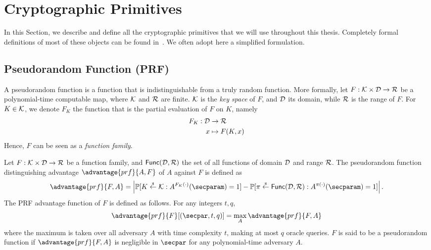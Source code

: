 
\section{Cryptographic Primitives} %
\label{sec:cryptographic_primitives}

In this Section, we describe and define all the cryptographic primitives that we will use throughout this thesis.
Completely formal definitions of most of these objects can be found in~\cite{BOOK:Goldreich04}.
We often adopt here a simplified formulation.

\subsection{Pseudorandom Function (PRF)} %
\label{sub:def_prf}

A pseudorandom function is a function that is indistinguishable from a truly random function.
More formally, let $F: \mathcal{K} \times \mathcal{D} \rightarrow \mathcal{R}$ be a polynomial-time computable map, where $\mathcal{K}$ and $\mathcal{R}$ are finite. 
$\mathcal{K}$ is the \emph{key space} of $F$, and $\mathcal{D}$ its domain, while $\mathcal{R}$ is the range of $F$.
For $K \in \mathcal{K}$, we denote $F_K$ the function that is the partial evaluation of $F$ on $K$, namely
\begin{align*}
	F_K : \mathcal{D} &\rightarrow \mathcal{R} \\
		x &\mapsto F(K,x)
\end{align*}
Hence, $F$ can be seen as a \emph{function family}. 

\begin{definition}
	\label{def:prf}
	Let $F: \mathcal{K} \times \mathcal{D} \rightarrow \mathcal{R}$ be a function family, and $\mathsf{Func}(\mathcal{D},\mathcal{R})$ the set of all functions of domain $\mathcal{D}$ and range $\mathcal{R}$.
	The pseudorandom function distinguishing advantage $\advantage{prf}{A, F}$ of $A$ against $F$ is defined as
	\[
		\advantage{prf}{F,A} = \left| \Prob[K \getsr \cK : A^{F_K(\cdot)}(\secparam) = 1] 
												- \Prob[\pi \getsr \mathsf{Func}(\cD,\cR) : A^{\pi(\cdot)}(\secparam) = 1] \right|.
	\]
	The PRF advantage function of $F$ is defined as follows. For any integers $t,q$,
	\[
		\advantage{prf}{F}[(\secpar, t, q)] = \max_{A} \advantage{prf}{F, A}
	\]
	where the maximum is taken over all adversary $A$ with time complexity $t$, making at most $q$ oracle queries.
	$F$ is said to be a pseudorandom function if $\advantage{prf}{F,A}$ is negligible in $\secpar$ for any polynomial-time adversary $A$.
\end{definition}




